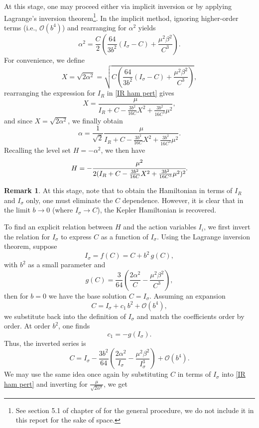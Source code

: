 \documentclass[12pt,oneside]{report}
\theoremstyle{definition}
\newtheorem{remark}{Remark}
\begin{document}
At this stage, one may proceed either via implicit inversion or by applying Lagrange's inversion theorem\footnote{See section 5.1 of chapter of \cite{wilf2005generatingfunctionology} for the general procedure, we do not include it in this report for the sake of space.}. In the implicit method, ignoring higher-order terms (i.e., \(\mathcal{O}(b^{4})\)) and rearranging for \(\alpha^{2}\) yields
$$
\alpha^{2} = \frac{C}{2} \left( \frac{64}{3b^{2}}(I_{\sigma} - C) + \frac{\mu^{2}\beta^{2}}{C^{3}} \right).
$$
For convenience, we define
$$X = \sqrt{2\alpha^2} = \sqrt{C \left( \frac{64}{3b^{2}}(I_{\sigma} - C) + \frac{\mu^{2}\beta^{2}}{C^{3}} \right)},$$
rearranging the expression for \(I_{R}\) in \eqref{IR ham pert} gives
\begin{equation*}
X = \frac{\mu}{I_{R} + C - \frac{3b^{2}}{16C} X^2 + \frac{3b^{2}}{16C^3} \mu^2},
\end{equation*}
and since \(X = \sqrt{2\alpha^2}\), we finally obtain
\begin{equation}
\alpha = \frac{1}{\sqrt{2}} \frac{\mu}{I_{R} + C - \frac{3b^{2}}{16C} X^2 + \frac{3b^{2}}{16C^3} \mu^2}.
\end{equation}
Recalling the level set \(H = -\alpha^{2}\), we then have
$$H = -\cfrac{\mu^{2}}{2(I_{R} + C - \frac{3b^{2}}{16C} X^2 + \frac{3b^{2}}{16C^3} \mu^2)^{2}}.$$
\begin{remark}
 At this stage, note that to obtain the Hamiltonian in terms of \(I_{R}\) and \(I_{\sigma}\) only, one must eliminate the \(C\) dependence. However, it is clear that in the limit \(b\to0\) (where \(I_{\sigma}\to C\)), the Kepler Hamiltonian is recovered.
\end{remark}
To find an explicit relation between \(H\) and the action variables \(I_i\), we first invert the relation for \(I_{\sigma}\) to express \(C\) as a function of \(I_{\sigma}\). Using the Lagrange inversion theorem, suppose
$$
I_\sigma = f(C) = C + b^{2}\,g(C),
$$
with \(b^{2}\) as a small parameter and
$$
g(C) = \frac{3}{64} \left(\frac{2\alpha^{2}}{C} - \frac{\mu^{2}\beta^{2}}{C^{3}}\right),
$$
then for $b=0$ we have the base solution $C=I_\sigma$. Assuming an expansion
$$
C = I_\sigma + c_1\,b^{2} + \mathcal{O}(b^4),
$$
we substitute back into the definition of $I_\sigma$ and match the coefficients order by order. At order $b^{2}$, one finds
$$
c_1 = -g(I_\sigma).
$$
Thus, the inverted series is
$$
C = I_\sigma - \frac{3b^{2}}{64}\left(\frac{2\alpha^{2}}{I_\sigma} - \frac{\mu^{2}\beta^{2}}{I_\sigma^{3}}\right) + \mathcal{O}(b^{4}).
$$
We may use the same idea once again by substituting $C$ in terms of $I_{\sigma}$ into \autoref{IR ham pert} and inverting for $\frac{\mu}{\sqrt{2\alpha^{2}}}$, we get
\end{document}
